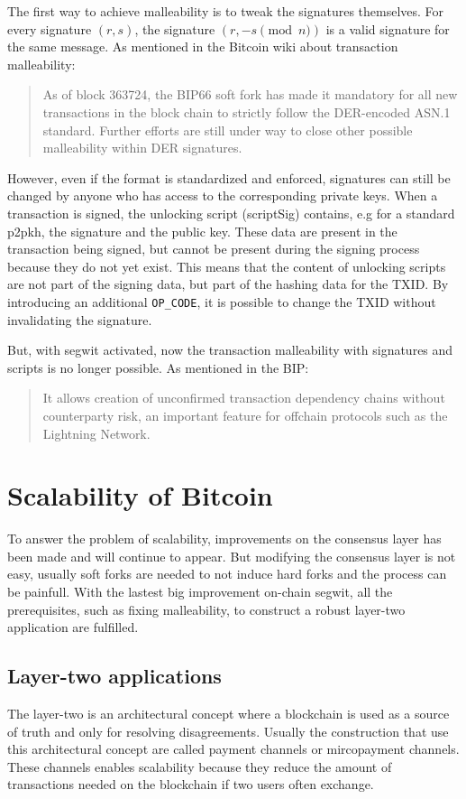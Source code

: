 The first way to achieve malleability is to tweak the signatures themselves. For
every signature $(r, s)$, the signature $(r, -s \pmod n)$ is a valid signature for
the same message. As mentioned in the Bitcoin wiki about transaction malleability:

\begin{quote}
	As of block 363724, the BIP66 soft fork has made it mandatory for all new
	transactions in the block chain to strictly follow the DER-encoded ASN.1 standard.
	Further efforts are still under way to close other possible malleability within
	DER signatures.
\end{quote}

However, even if the format is standardized and enforced, signatures can still be
changed by anyone who has access to the corresponding private keys. When a transaction
is signed, the unlocking script (scriptSig) contains, e.g for a standard \gls{p2pkh},
the signature and the public key. These data are present in the transaction being signed,
but cannot be present during the signing process because they do not yet exist. This
means that the content of unlocking scripts are not part of the signing data, but
part of the hashing data for the TXID. By introducing an additional \texttt{OP\_CODE},
it is possible to change the TXID without invalidating the signature.

But, with \gls{segwit} activated, now the transaction malleability with signatures
and scripts is no longer possible. As mentioned in the BIP:

\begin{quote}
	It allows creation of unconfirmed transaction dependency chains without
	counterparty risk, an important feature for offchain protocols such as the
	Lightning Network.
\end{quote}


\section{Scalability of Bitcoin}

To answer the problem of scalability, improvements on the consensus layer has been
made and will continue to appear. But modifying the consensus layer is not easy,
usually soft forks are needed to not induce hard forks and the process can be
painfull. With the lastest big improvement on-chain \gls{segwit}, all the prerequisites,
such as fixing malleability, to construct a robust layer-two application are fulfilled.

\subsection{Layer-two applications}

The layer-two is an architectural concept where a blockchain is used as a source
of truth and only for resolving disagreements. Usually the construction that use
this architectural concept are called payment channels or mircopayment channels.
These channels enables scalability because they reduce the amount of transactions
needed on the blockchain if two users often exchange.
